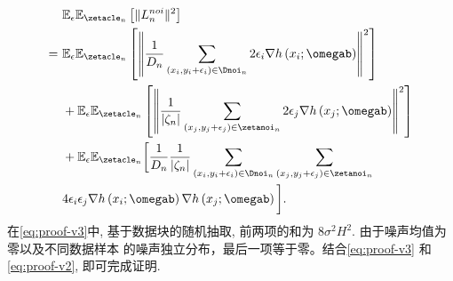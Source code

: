 \begin{align}\label{eq:proof-v3}
&\mathbb{E}_\epsilon\mathbb{E}_{\zetacle_n}\left[\Vert L_n^{noi}\Vert^2\right] \notag \\
=~&\mathbb{E}_\epsilon\mathbb{E}_{\zetacle_n}\left[\left\Vert \frac{1}{D_n}\sum_{\left(x_i,y_i+\epsilon_i\right)\in \Dnoi_n}2\epsilon_i\nabla h\left(x_i;\omegab\right)\right\Vert^2\right]\notag \\
&+\mathbb{E}_\epsilon\mathbb{E}_{\zetacle_n}\left[\left\Vert\frac{1}{|\zeta_n|}\sum_{\left(x_{j},y_j+\epsilon_j\right)\in \zetanoi_n}2\epsilon_j\nabla h\left(x_j;\omegab\right)\right\Vert^2\right]\notag \\
&+\mathbb{E}_\epsilon\mathbb{E}_{\zetacle_n}\biggl[ \frac{1}{D_n}\frac{1}{|\zeta_n|}\sum_{\left(x_i,y_i+\epsilon_i\right)\in \Dnoi_n}\sum_{\left(x_j,y_j+\epsilon_j\right)\in \zetanoi_n}\notag \\
&4\epsilon_i\epsilon_j\nabla h\left(x_i;\omegab\right)\nabla h\left(x_j;\omegab\right)\biggl].
\end{align}
在\eqref{eq:proof-v3}中, 基于数据块的随机抽取, 前两项的和为 $8\sigma^2 H^2$. 由于噪声均值为零以及不同数据样本
的噪声独立分布，最后一项等于零。结合\eqref{eq:proof-v3} 和\eqref{eq:proof-v2}, 即可完成证明.

